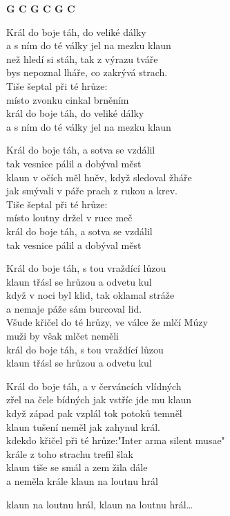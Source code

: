 
\re{}
{\footnotesize\textbf{G C G C G C}}

\ve{} 
Král do boje táh, do veliké dálky \\
a s ním do té války jel na mezku klaun\\
než hledí si stáh, tak z výrazu tváře \\
bys nepoznal lháře, co zakrývá strach.\\
Tiše šeptal při té hrůze: \\
místo zvonku cinkal brněním \\
král do boje táh, do veliké dálky \\
a s ním do té války jel na mezku klaun 

\ve{}
Král do boje táh, a sotva se vzdálil\\
tak vesnice pálil a dobýval měst\\
klaun v očích měl hněv, když sledoval žháře\\
jak smývali v páře prach z rukou a krev.\\
Tiše šeptal při té hrůze: \\
místo loutny držel v ruce meč\\
král do boje táh, a sotva se vzdálil\\
tak vesnice pálil a dobýval měst

\ve{}
Král do boje táh, s tou vraždící lůzou\\
klaun třásl se hrůzou a odvetu kul\\
když v noci byl klid, tak oklamal stráže\\
a nemaje páže sám burcoval lid.\\
Všude křičel do té hrůzy, ve válce že mlčí Múzy\\
muži by však mlčet neměli\\
král do boje táh, s tou vraždící lůzou\\
klaun třásl se hrůzou a odvetu kul

\ve{}
Král do boje táh, a v červáncích vlídných\\
zřel na čele bídných jak vstříc jde mu klaun\\
když západ pak vzplál tok potoků temněl\\
klaun tušení neměl jak zahynul král.\\
kdekdo křičel při té hrůze:"Inter arma silent musae"\\
krále z toho strachu trefil šlak\\
klaun tiše se smál a zem žila dále\\
a neměla krále klaun na loutnu hrál
 
klaun na loutnu hrál, klaun na loutnu hrál\ldots{}

\esong{}